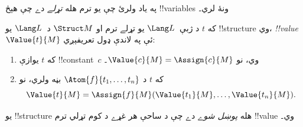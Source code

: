 \documentclass[../../../include/open-logic-section]{subfiles}
\begin{document}


\begin{explain}
په ياد ولرئ چې يو ترم هله \emph{تړلے} دے چې هېڅ !!{variable}s ونۀ لري۔
\end{explain}

\begin{defn}
که $t$ د ژبې~$\Lang L$ يو تړلے ترم او $\Struct M$ د~$\Lang L$ يو
!!{structure} وي، \emph{!!{value}}~$\Value{t}{M}$ ئې په لاندې ډول
تعريفېږي:
\begin{enumerate}
\item که $t$ يوازې !!{constant}~$c$ وي، نو
  $\Value{c}{M} = \Assign{c}{M}$۔
\item که $t$ د $\Atom{f}{t_1, \ldots, t_n}$ بڼه ولري، نو
  \[
  \Value{t}{M} = \Assign{f}{M}(\Value{t_1}{M}, \ldots,
  \Value{t_n}{M}).
  \]
\end{enumerate}
\end{defn}

\begin{defn}
يو !!{structure} هله \emph{پوښل شوے} دے چې د ساحې هر غړے د کوم تړلي
ترم !!{value} وي۔
\end{defn}
\end{document}
